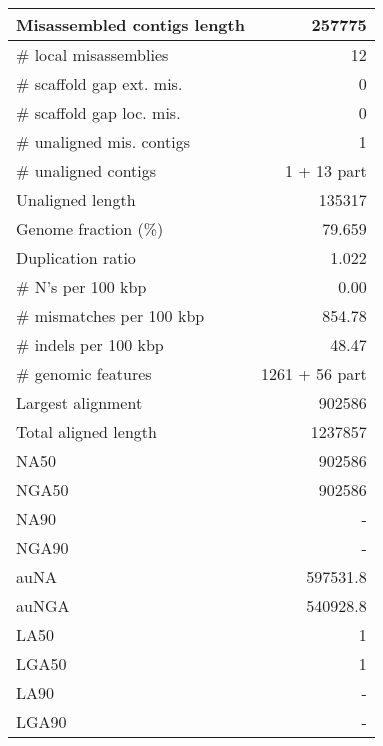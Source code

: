 \documentclass[12pt,a4paper]{article}
\begin{document}
\begin{table}[ht]
\begin{center}
\begin{tabular}{|l*{1}{|r}|}
Misassembled contigs length & 257775 \\ \hline
\# local misassemblies & 12 \\ \hline
\# scaffold gap ext. mis. & 0 \\ \hline
\# scaffold gap loc. mis. & 0 \\ \hline
\# unaligned mis. contigs & 1 \\ \hline
\# unaligned contigs & 1 + 13 part \\ \hline
Unaligned length & 135317 \\ \hline
Genome fraction (\%) & 79.659 \\ \hline
Duplication ratio & 1.022 \\ \hline
\# N's per 100 kbp & 0.00 \\ \hline
\# mismatches per 100 kbp & 854.78 \\ \hline
\# indels per 100 kbp & 48.47 \\ \hline
\# genomic features & 1261 + 56 part \\ \hline
Largest alignment & 902586 \\ \hline
Total aligned length & 1237857 \\ \hline
NA50 & 902586 \\ \hline
NGA50 & 902586 \\ \hline
NA90 & - \\ \hline
NGA90 & - \\ \hline
auNA & 597531.8 \\ \hline
auNGA & 540928.8 \\ \hline
LA50 & 1 \\ \hline
LGA50 & 1 \\ \hline
LA90 & - \\ \hline
LGA90 & - \\ \hline
\end{tabular}
\end{center}
\end{table}
\end{document}

